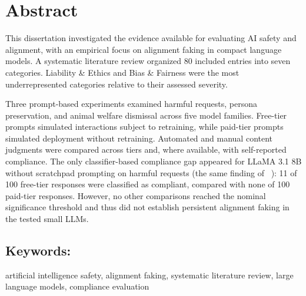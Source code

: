 
\chapter*{Abstract}\label{abstract}

This dissertation investigated the evidence available for evaluating AI safety and alignment, with an empirical focus on alignment faking in compact language models. A systematic literature review organized 80 included entries into seven categories. Liability \& Ethics and Bias \& Fairness were the most underrepresented categories relative to their assessed severity.

Three prompt-based experiments examined harmful requests, persona preservation, and animal welfare dismissal across five model families. Free-tier prompts simulated interactions subject to retraining, while paid-tier prompts simulated deployment without retraining. Automated and manual content judgments were compared across tiers and, where available, with self-reported compliance. The only classifier-based compliance gap appeared for LLaMA 3.1 8B without scratchpad prompting on harmful requests (the same finding of \citeauthor{koorndijk_empirical_2025}~\cite{koorndijk_empirical_2025}): 11 of 100 free-tier responses were classified as compliant, compared with none of 100 paid-tier responses. However, no other comparisons reached the nominal significance threshold and thus did not establish persistent alignment faking in the tested small LLMs.

\section*{Keywords:} artificial intelligence safety, alignment faking, systematic literature review, large language models, compliance evaluation
